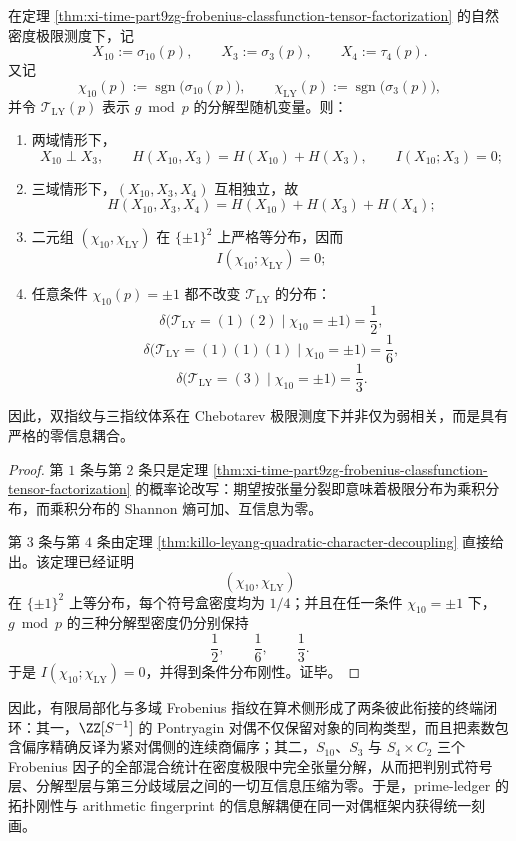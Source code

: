 \begin{corollary}[算术指纹的零互信息律]\label{cor:xi-time-part9zg-arithmetic-fingerprint-zero-mutual-information}
在定理 \ref{thm:xi-time-part9zg-frobenius-classfunction-tensor-factorization} 的自然密度极限测度下，记
\[
X_{10}:=\sigma_{10}(p),\qquad
X_3:=\sigma_3(p),\qquad
X_4:=\tau_4(p).
\]
又记
\[
\chi_{10}(p):=\operatorname{sgn}\!\bigl(\sigma_{10}(p)\bigr),
\qquad
\chi_{\mathrm{LY}}(p):=\operatorname{sgn}\!\bigl(\sigma_3(p)\bigr),
\]
并令 \(\mathcal T_{\mathrm{LY}}(p)\) 表示 \(g\bmod p\) 的分解型随机变量。则：
\begin{enumerate}
  \item 两域情形下，
  \[
  X_{10}\perp X_3,
  \qquad
  H(X_{10},X_3)=H(X_{10})+H(X_3),
  \qquad
  I(X_{10};X_3)=0;
  \]
  \item 三域情形下，\((X_{10},X_3,X_4)\) 互相独立，故
  \[
  H(X_{10},X_3,X_4)=H(X_{10})+H(X_3)+H(X_4);
  \]
  \item 二元组 \((\chi_{10},\chi_{\mathrm{LY}})\) 在 \(\{\pm1\}^2\) 上严格等分布，因而
  \[
  I(\chi_{10};\chi_{\mathrm{LY}})=0;
  \]
  \item 任意条件 \(\chi_{10}(p)=\pm1\) 都不改变 \(\mathcal T_{\mathrm{LY}}\) 的分布：
  \[
  \delta\!\bigl(\mathcal T_{\mathrm{LY}}=(1)(2)\mid \chi_{10}=\pm1\bigr)=\frac12,
  \]
  \[
  \delta\!\bigl(\mathcal T_{\mathrm{LY}}=(1)(1)(1)\mid \chi_{10}=\pm1\bigr)=\frac16,
  \]
  \[
  \delta\!\bigl(\mathcal T_{\mathrm{LY}}=(3)\mid \chi_{10}=\pm1\bigr)=\frac13.
  \]
\end{enumerate}
因此，双指纹与三指纹体系在 Chebotarev 极限测度下并非仅为弱相关，而是具有严格的零信息耦合。
\end{corollary}
\begin{proof}
第 \(1\) 条与第 \(2\) 条只是定理 \ref{thm:xi-time-part9zg-frobenius-classfunction-tensor-factorization} 的概率论改写：期望按张量分裂即意味着极限分布为乘积分布，而乘积分布的 Shannon 熵可加、互信息为零。

第 \(3\) 条与第 \(4\) 条由定理 \ref{thm:killo-leyang-quadratic-character-decoupling} 直接给出。该定理已经证明
\[
(\chi_{10},\chi_{\mathrm{LY}})
\]
在 \(\{\pm1\}^2\) 上等分布，每个符号盒密度均为 \(1/4\)；并且在任一条件 \(\chi_{10}=\pm1\) 下，\(g\bmod p\) 的三种分解型密度仍分别保持
\[
\frac12,\qquad \frac16,\qquad \frac13.
\]
于是 \(I(\chi_{10};\chi_{\mathrm{LY}})=0\)，并得到条件分布刚性。证毕。
\end{proof}



\noindent
因此，有限局部化与多域 Frobenius 指纹在算术侧形成了两条彼此衔接的终端闭环：其一，\(\ZZ[S^{-1}]\) 的 Pontryagin 对偶不仅保留对象的同构类型，而且把素数包含偏序精确反译为紧对偶侧的连续商偏序；其二，\(S_{10}\)、\(S_3\) 与 \(S_4\times C_2\) 三个 Frobenius 因子的全部混合统计在密度极限中完全张量分解，从而把判别式符号层、分解型层与第三分歧域层之间的一切互信息压缩为零。于是，prime-ledger 的拓扑刚性与 arithmetic fingerprint 的信息解耦便在同一对偶框架内获得统一刻画。

\endinput

